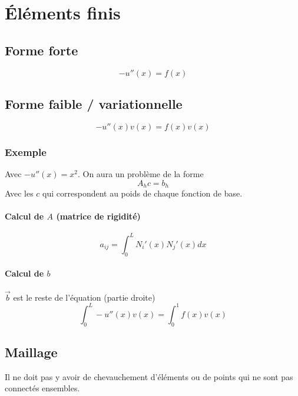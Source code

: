 \documentclass[resume]{subfiles}
\begin{document}
\section{Éléments finis}
\subsection{Forme forte}
$$-u''(x)=f(x)$$
\subsection{Forme faible / variationnelle}
$$-u''(x)v(x)=f(x)v(x)$$
\subsubsection{Exemple}
Avec $-u''(x)=x^2$. On aura un problème de la forme
$$\boxed{A_hc=b_h}$$
Avec les $c$ qui correspondent au poids de chaque fonction de base.
\paragraph{Calcul de $A$ (matrice de rigidité)}
$$a_{ij}=\int_{0}^{L}N_i'(x)N_j'(x)dx$$
\paragraph{Calcul de $b$}
$\vec{b}$ est le reste de l'équation (partie droite)
$$\int_{0}^{L}-u''(x)v(x)=\int_{0}^{1}f(x)v(x)$$
\subsection{Maillage}
Il ne doit pas y avoir de chevauchement d'éléments ou de points qui ne sont pas connectés ensembles.
\end{document}

